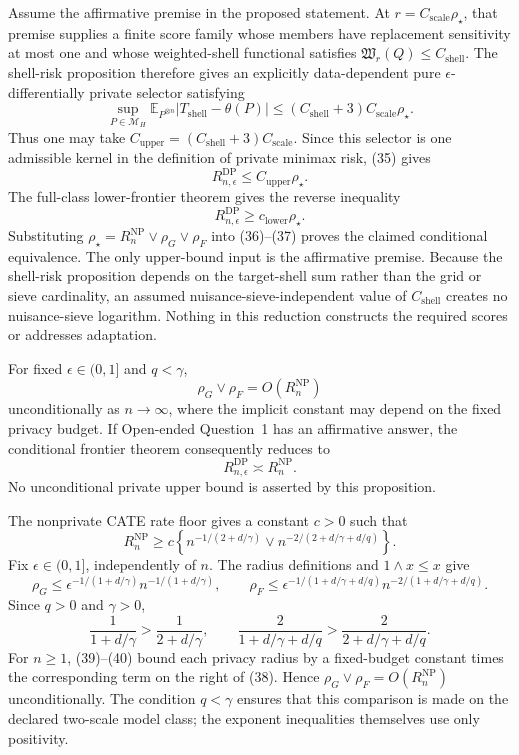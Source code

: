 Assume the affirmative premise in the proposed statement.  At \(r=C_{\mathrm{scale}}\rho_\star\), that premise supplies a finite score family whose members have replacement sensitivity at most one and whose weighted-shell functional satisfies \(\mathfrak W_r(Q)\le C_{\mathrm{shell}}\).  The shell-risk proposition therefore gives an explicitly data-dependent pure \(\epsilon\)-differentially private selector satisfying
\[
 \sup_{P\in\mathcal M_H}\mathbb E_{P^{\otimes n}}
 |T_{\mathrm{shell}}-\theta(P)|
 \le(C_{\mathrm{shell}}+3)C_{\mathrm{scale}}\rho_\star.
 \tag{35}
\]
Thus one may take \(C_{\mathrm{upper}}=(C_{\mathrm{shell}}+3)C_{\mathrm{scale}}\).  Since this selector is one admissible kernel in the definition of private minimax risk, (35) gives
\[
 R_{n,\epsilon}^{\mathrm{DP}}\le C_{\mathrm{upper}}\rho_\star.
 \tag{36}
\]
The full-class lower-frontier theorem gives the reverse inequality
\[
 R_{n,\epsilon}^{\mathrm{DP}}\ge c_{\mathrm{lower}}\rho_\star.
 \tag{37}
\]
Substituting \(\rho_\star=R_n^{\mathrm{NP}}\vee\rho_G\vee\rho_F\) into (36)--(37) proves the claimed conditional equivalence.  The only upper-bound input is the affirmative premise.  Because the shell-risk proposition depends on the target-shell sum rather than the grid or sieve cardinality, an assumed nuisance-sieve-independent value of \(C_{\mathrm{shell}}\) creates no nuisance-sieve logarithm.  Nothing in this reduction constructs the required scores or addresses adaptation.

For fixed \(\epsilon\in(0,1]\) and \(q<\gamma\),
\[
 \rho_G\vee\rho_F=O(R_n^{\mathrm{NP}})
\]
unconditionally as \(n\to\infty\), where the implicit constant may depend on the fixed privacy budget.  If Open-ended Question~1 has an affirmative answer, the conditional frontier theorem consequently reduces to
\[
 R_{n,\epsilon}^{\mathrm{DP}}\asymp R_n^{\mathrm{NP}}.
\]
No unconditional private upper bound is asserted by this proposition.

The nonprivate CATE rate floor gives a constant \(c>0\) such that
\[
 R_n^{\mathrm{NP}}
 \ge c\left\{n^{-1/(2+d/\gamma)}
 \vee n^{-2/(2+d/\gamma+d/q)}\right\}.
 \tag{38}
\]
Fix \(\epsilon\in(0,1]\), independently of \(n\).  The radius definitions and \(1\wedge x\le x\) give
\[
 \rho_G\le\epsilon^{-1/(1+d/\gamma)}n^{-1/(1+d/\gamma)},
 \qquad
 \rho_F\le\epsilon^{-1/(1+d/\gamma+d/q)}n^{-2/(1+d/\gamma+d/q)}.
 \tag{39}
\]
Since \(q>0\) and \(\gamma>0\),
\[
 \frac1{1+d/\gamma}>\frac1{2+d/\gamma},
 \qquad
 \frac2{1+d/\gamma+d/q}>\frac2{2+d/\gamma+d/q}.
 \tag{40}
\]
For \(n\ge1\), (39)--(40) bound each privacy radius by a fixed-budget constant times the corresponding term on the right of (38).  Hence \(\rho_G\vee\rho_F=O(R_n^{\mathrm{NP}})\) unconditionally.  The condition \(q<\gamma\) ensures that this comparison is made on the declared two-scale model class; the exponent inequalities themselves use only positivity.

